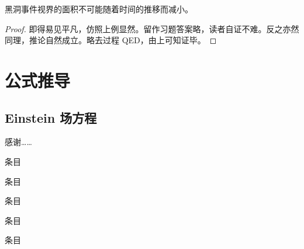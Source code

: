 \documentclass[newenv,final]{ncuthesis}
\begin{document}
\begin{law}[黑洞面积定律]
  黑洞事件视界的面积不可能随着时间的推移而减小。
\end{law}
\begin{proof}
即得易见平凡，仿照上例显然。留作习题答案略，读者自证不难。反之亦然同理，推论自然成立。略去过程 QED，由上可知证毕。
\end{proof}
\appendix
\chapter{公式推导}
\section{Einstein 场方程}
\backmatter

\begin{acknowledgements}
感谢……
\end{acknowledgements}
\begin{researchresults}
\begin{published}
\item 条目
\end{published}
\begin{tobepublished}
\item 条目
\end{tobepublished}
\begin{reports}
\item 条目
\end{reports}
\begin{others}[另外还有] %
\item 条目
\end{others}
\begin{papers}
\item 条目
\end{papers}
\end{researchresults}
\end{document}
